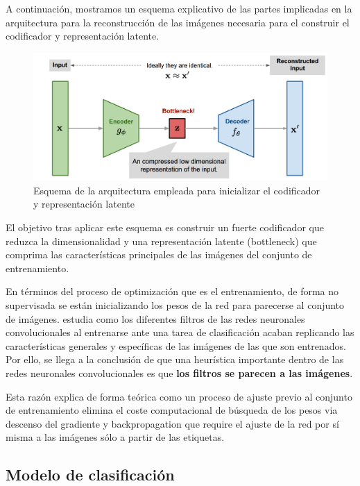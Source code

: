 A continuación, mostramos un esquema explicativo de las partes implicadas en la arquitectura para la reconstrucción de las imágenes necesaria para el construir el codificador y representación latente.

\begin{figure}[H]
	\centering
	\includegraphics[width=1.0\linewidth]{imagenes/esquema_codificador.png}
	\caption{Esquema de la arquitectura empleada para inicializar el codificador y representación latente}
\end{figure}


El objetivo tras aplicar este esquema es construir un fuerte codificador que reduzca la dimensionalidad y una representación latente (bottleneck) que comprima las características principales de las imágenes del conjunto de entrenamiento.

En términos del proceso de optimización que es el entrenamiento, de forma no supervisada se están inicializando los pesos de la red para parecerse al conjunto de imágenes. \cite{zeiler2014visualizing} estudia como los diferentes filtros de las redes neuronales convolucionales al entrenarse ante una tarea de clasificación acaban replicando las características generales y específicas de las imágenes de las que son entrenados. Por ello, se llega a la conclusión de que una heurística importante dentro de las redes neuronales convolucionales es que \textbf{los filtros se parecen a las imágenes}. 

Esta razón explica de forma teórica como un proceso de ajuste previo al conjunto de entrenamiento elimina el coste computacional de búsqueda de los pesos via descenso del gradiente y backpropagation que require el ajuste de la red por sí misma a las imágenes sólo a partir de las etiquetas.

\subsection{Modelo de clasificación}

